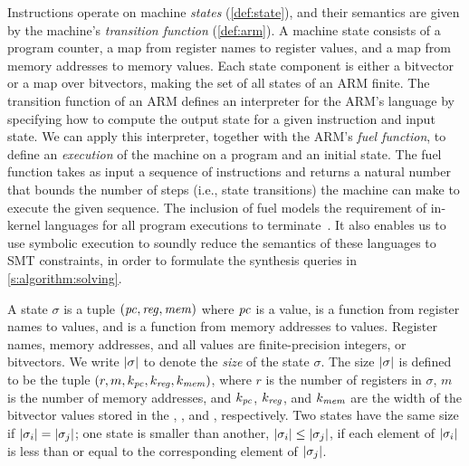 Instructions operate on machine \emph{states} (\autoref{def:state}), and their
semantics are given by the machine's \emph{transition function}
(\autoref{def:arm}). A machine state  consists of a program counter, a map from
register names to register values, and a map from memory addresses to memory
values. Each state component is either a bitvector or a map over bitvectors,
making the set of all states of an ARM finite. The transition function of an ARM
defines an interpreter for the ARM's language by specifying how to compute the
output state for a given instruction and input state. We can apply this
interpreter, together with the ARM's \emph{fuel function}, to define an
\emph{execution} of the machine on a program and an initial state. The fuel
function takes as input a sequence of instructions and returns a natural number
that bounds the number of steps (i.e., state transitions) the machine can make
to execute the given sequence. The inclusion of fuel models the requirement of
in-kernel languages for all program executions to terminate~\cite{wang:jitk}. It
also enables us to use symbolic execution to soundly reduce the semantics of
these languages to SMT constraints, in order to formulate the synthesis queries
in \autoref{s:algorithm:solving}.\tighten 


\begin{definition}[State]\label{def:state}
 A \textup{state} $\sigma$ is a tuple $(\mathit{pc}, \mathit{reg}, \mathit{mem})$ where $\mathit{pc}$ is a
 value, \regs is a function from register names to values, and \mem is a
 function from memory addresses to values. Register names, memory addresses, and
 all values are finite-precision integers, or bitvectors. We write
 $|\sigma|$ to denote the \emph{size} of the state $\sigma$. The size
 $|\sigma|$ is defined to be the tuple $(r, m, k_\mathit{pc}, k_\mathit{reg}, k_\mathit{mem})$,
 where $r$ is the number of registers in $\sigma$, $m$ is the number of memory
 addresses, and $k_\mathit{pc}$, $k_\mathit{reg}$, and $k_\mathit{mem}$ are the width of the bitvector
 values stored in the \pc, \regs, and \mem, respectively. Two states have the
 same size if $|\sigma_i| = |\sigma_j|$; one state is smaller than
 another, $|\sigma_i| \leq |\sigma_j|$, if each element of $|\sigma_i|$ 
 is less than or equal to the corresponding element of $|\sigma_j|$.\tighten
 \end{definition}


